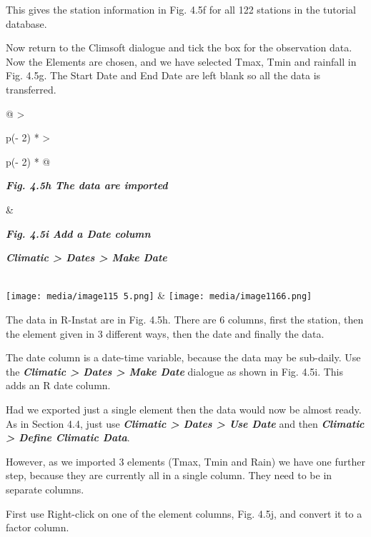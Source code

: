 \documentclass[
  letterpaper,
  DIV=11,
  numbers=noendperiod]{scrreprt}
\begin{document}
This gives the station information in Fig. 4.5f for all 122 stations in
the tutorial database.

Now return to the Climsoft dialogue and tick the box for the observation
data. Now the Elements are chosen, and we have selected Tmax, Tmin and
rainfall in Fig. 4.5g. The Start Date and End Date are left blank so all
the data is transferred.

\begin{longtable}[]{@{}
  >{\raggedright\arraybackslash}p{(\columnwidth - 2\tabcolsep) * }
  >{\raggedright\arraybackslash}p{(\columnwidth - 2\tabcolsep) * }@{}}
\toprule\noalign{}
\begin{minipage}[b]{\linewidth}\raggedright
\textbf{\emph{Fig. 4.5h The data are imported}}
\end{minipage} & \begin{minipage}[b]{\linewidth}\raggedright
\textbf{\emph{Fig. 4.5i Add a Date column}}

\textbf{\emph{Climatic \textgreater{} Dates \textgreater{} Make Date}}
\end{minipage} \\
\midrule\noalign{}
\endhead
\bottomrule\noalign{}
\endlastfoot
\texttt{[image: media/image115 5.png]}
&
\texttt{[image: media/image1166.png]} \\
\end{longtable}

The data in R-Instat are in Fig. 4.5h. There are 6 columns, first the
station, then the element given in 3 different ways, then the date and
finally the data.

The date column is a date-time variable, because the data may be
sub-daily. Use the \textbf{\emph{Climatic \textgreater{} Dates
\textgreater{} Make Date}} dialogue as shown in Fig. 4.5i. This adds an
R date column.

Had we exported just a single element then the data would now be almost
ready. As in Section 4.4, just use \textbf{\emph{Climatic \textgreater{}
Dates \textgreater{} Use Date}} and then \textbf{\emph{Climatic
\textgreater{} Define Climatic Data}}.

However, as we imported 3 elements (Tmax, Tmin and Rain) we have one
further step, because they are currently all in a single column. They
need to be in separate columns.

First use Right-click on one of the element columns, Fig. 4.5j, and
convert it to a factor column.
\end{document}
